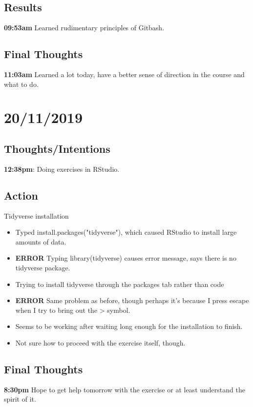 \documentclass{article}
\begin{document}
\subsection{Results}

\textbf{09:53am} Learned rudimentary principles of Gitbash.

\subsection{Final Thoughts}

\textbf{11:03am} Learned a lot today, have a better sense of direction in the course and what to do.

\section{20/11/2019}
\subsection{Thoughts/Intentions}
\textbf{12:38pm}:  Doing exercises in RStudio.

\subsection{Action}

Tidyverse installation 
\begin{itemize}
\item Typed install.packages("tidyverse"), which caused RStudio to install large amounts of data.
\item \textbf{ERROR} Typing library(tidyverse) causes error message, says there is no tidyverse package.
\item Trying to install tidyverse through the packages tab rather than code
\item \textbf{ERROR} Same problem as before, though perhaps it's because I press escape when I try to bring out the > symbol.
\item Seems to be working after waiting long enough for the installation to finish.
\item Not sure how to proceed with the exercise itself, though.
\end{itemize}

\subsection{Final Thoughts}
\textbf{8:30pm} Hope to get help tomorrow with the exercise or at least understand the spirit of it.
\end{document}
